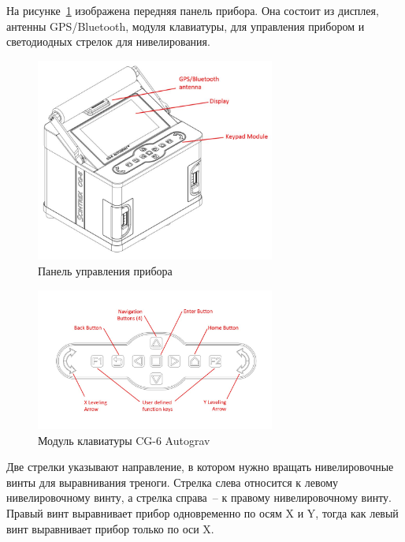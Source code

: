На рисунке~\ref{fig:the_cg6_autograv_console} изображена передняя панель
прибора. Она состоит из дисплея, антенны GPS/Bluetooth, модуля клавиатуры, для
управления прибором и светодиодных стрелок для нивелирования.

\begin{figure}%
  \centering
  \includegraphics[width=0.7\textwidth]{figures/the_cg6_autograv_console}
  \caption{Панель управления прибора \cg{}}
  \label{fig:the_cg6_autograv_console}
\end{figure}

\begin{figure}%
  \centering
  \includegraphics[width=0.7\textwidth]{figures/the_cg6_autograv_keypad_module}
  \caption{Модуль клавиатуры CG-6 Autograv}
  \label{fig:the_cg6_autograv_keypad_module}
\end{figure}

Две стрелки указывают направление, в котором нужно вращать нивелировочные винты
для выравнивания треноги. Стрелка слева относится к левому нивелировочному
винту, а стрелка справа~-- к правому нивелировочному винту.  Правый винт
выравнивает прибор одновременно по осям X и Y, тогда как левый винт выравнивает
прибор только по оси X.


